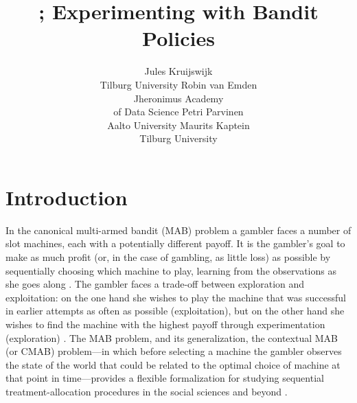 \documentclass[nojss]{jss}
\author{Jules Kruijswijk\\Tilburg University \And
	Robin van Emden\\Jheronimus Academy \\ of Data Science \And
	Petri Parvinen\\Aalto University \And
	Maurits Kaptein\\Tilburg University}
\title{\pkg{StreamingBandit}; Experimenting with Bandit Policies}
\begin{document}
\section{Introduction}

In the canonical multi-armed bandit (MAB) problem a gambler faces a number of slot machines, each with a potentially different payoff. It is the gambler's goal to make as much profit (or, in the case of gambling, as little loss) as possible by sequentially choosing which machine to play, learning from the observations as she goes along \citep{Whittle1980, berry1985bandit}. The gambler faces a trade-off between exploration and exploitation: on the one hand she wishes to play the machine that was successful in earlier attempts as often as possible (exploitation), but on the other hand she wishes to find the machine with the highest payoff through experimentation (exploration) \citep{Macready1998}. The MAB problem, and its generalization, the contextual MAB (or CMAB) problem---in which before selecting a machine the gambler observes the state of the world that could be related to the optimal choice of machine at that point in time---provides a flexible formalization for studying sequential treatment-allocation procedures in the social sciences and beyond \citep{Dudik2011a, Li2010a, Agrawal2014}.
\end{document}

